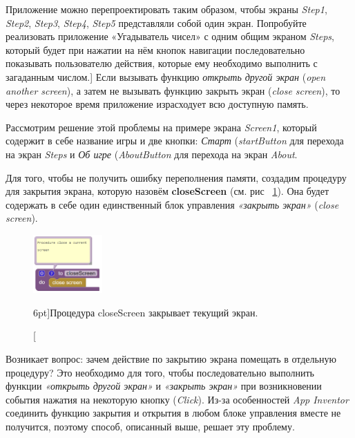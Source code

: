 \begin{mdfstyle}[nobreak=true,frametitle=Задание]
  \sloppy   
  Приложение можно перепроектировать таким образом, чтобы экраны \textit{Step1}, \textit{Step2}, \textit{Step3}, \textit{Step4}, \textit{Step5} представляли собой один экран. Попробуйте реализовать приложение «Угадыватель чисел» с одним общим экраном \textit{Steps}, который будет при нажатии на нём кнопок навигации последовательно показывать пользователю действия, которые ему необходимо выполнить с загаданным числом.]
  Если вызывать функцию \textit{открыть другой экран} (\textit{open another screen}), а затем не вызывать функцию закрыть экран (\textit{close screen}), то через некоторое время приложение израсходует всю доступную память.
  \end{mdfstyle}

Рассмотрим решение этой проблемы на примере экрана \textit{Screen1}, который содержит в себе название игры и две кнопки: \textit{Старт} (\textit{startButton} для перехода на экран \textit{Steps} и \textit{Об игре} (\textit{AboutButton} для перехода на экран \textit{About}.

Для того, чтобы не получить ошибку переполнения памяти, создадим процедуру для закрытия экрана, которую назовём \textbf{closeScreen} (см. рис ~\ref{fig:block:click:close:screen}). Она будет содержать в себе один единственный блок управления \textit{«закрыть экран»} (\textit{close screen}). 
\begin{figure}
  \includegraphics[width=100,heigth=100]{./graphics/programs/guess_numbers/procedure_closeScreen_AppInventor_2018.png}
    \caption[Процедура closeScreen.][6pt]{Процедура closeScreen закрывает текущий экран.}
  \label{fig:block:click:close:screen}
\end{figure}
Возникает вопрос: зачем действие по закрытию экрана помещать в отдельную процедуру? Это необходимо для того, чтобы последовательно выполнить функции \textit{«открыть другой экран»} и \textit{«закрыть экран»} при возникновении события нажатия на некоторую кнопку (\textit{Click}). Из-за особенностей \textit{App Inventor} соединить функцию закрытия и открытия в любом блоке управления вместе не получится, поэтому способ, описанный выше, решает эту проблему.

